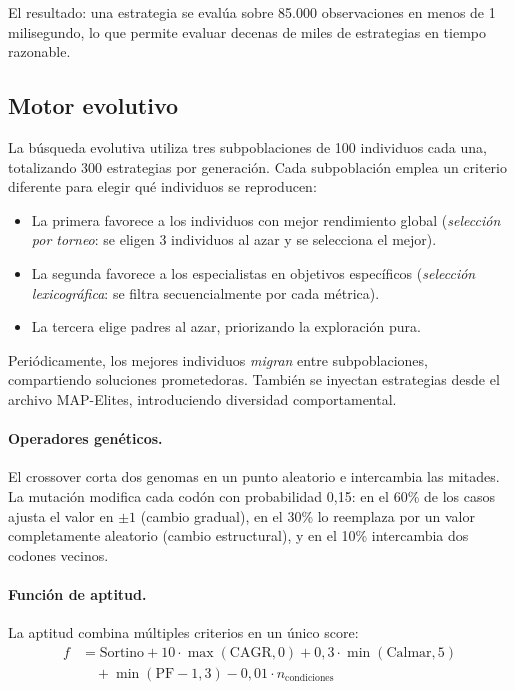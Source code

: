 \documentclass[12pt,a4paper]{article}
\begin{document}
El resultado: una estrategia se evalúa sobre 85.000 observaciones en menos de
1 milisegundo, lo que permite evaluar decenas de miles de estrategias en tiempo
razonable.

\subsection{Motor evolutivo}
\label{sec:engine}

La búsqueda evolutiva utiliza tres subpoblaciones de 100 individuos cada una,
totalizando 300 estrategias por generación. Cada subpoblación emplea un criterio
diferente para elegir qué individuos se reproducen:

\begin{itemize}
\item La primera favorece a los individuos con mejor rendimiento global
  (\textit{selección por torneo}: se eligen 3 individuos al azar y se selecciona
  el mejor).
\item La segunda favorece a los especialistas en objetivos específicos
  (\textit{selección lexicográfica}: se filtra secuencialmente por cada métrica).
\item La tercera elige padres al azar, priorizando la exploración pura.
\end{itemize}

Periódicamente, los mejores individuos \textit{migran} entre subpoblaciones,
compartiendo soluciones prometedoras. También se inyectan estrategias desde el archivo
MAP-Elites, introduciendo diversidad comportamental.

\paragraph{Operadores genéticos.} El crossover corta dos genomas en un punto aleatorio
e intercambia las mitades. La mutación modifica cada codón con probabilidad 0,15: en
el 60\% de los casos ajusta el valor en $\pm 1$ (cambio gradual), en el 30\% lo
reemplaza por un valor completamente aleatorio (cambio estructural), y en el 10\%
intercambia dos codones vecinos.

\paragraph{Función de aptitud.} La aptitud combina múltiples criterios en un único
score:
\begin{align}
f &= \text{Sortino} + 10 \cdot \max(\text{CAGR}, 0) + 0{,}3 \cdot \min(\text{Calmar}, 5) \nonumber\\
  &\quad + \min(\text{PF} - 1, 3)
  - 0{,}01 \cdot n_{\text{condiciones}}
\label{eq:fitness}
\end{align}
\end{document}
